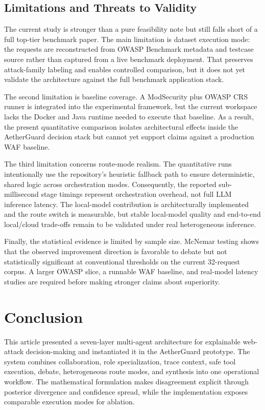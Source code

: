 \documentclass{ieeeaccess}
\newcommand{\sys}{AetherGuard}
\begin{document}
\subsection{Limitations and Threats to Validity}
The current study is stronger than a pure feasibility note but still falls short of a full top-tier benchmark paper. The main limitation is dataset execution mode: the requests are reconstructed from OWASP Benchmark metadata and testcase source rather than captured from a live benchmark deployment. That preserves attack-family labeling and enables controlled comparison, but it does not yet validate the architecture against the full benchmark application stack.

The second limitation is baseline coverage. A ModSecurity plus OWASP CRS runner is integrated into the experimental framework, but the current workspace lacks the Docker and Java runtime needed to execute that baseline. As a result, the present quantitative comparison isolates architectural effects inside the \sys{} decision stack but cannot yet support claims against a production WAF baseline.

The third limitation concerns route-mode realism. The quantitative runs intentionally use the repository's heuristic fallback path to ensure deterministic, shared logic across orchestration modes. Consequently, the reported sub-millisecond stage timings represent orchestration overhead, not full LLM inference latency. The local-model contribution is architecturally implemented and the route switch is measurable, but stable local-model quality and end-to-end local/cloud trade-offs remain to be validated under real heterogeneous inference.

Finally, the statistical evidence is limited by sample size. McNemar testing shows that the observed improvement direction is favorable to debate but not statistically significant at conventional thresholds on the current 32-request corpus. A larger OWASP slice, a runnable WAF baseline, and real-model latency studies are required before making stronger claims about superiority.

\section{Conclusion}
\label{sec:conclusion}

This article presented a seven-layer multi-agent architecture for explainable web-attack decision-making and instantiated it in the \sys{} prototype. The system combines collaboration, role specialization, trace context, safe tool execution, debate, heterogeneous route modes, and synthesis into one operational workflow. The mathematical formulation makes disagreement explicit through posterior divergence and confidence spread, while the implementation exposes comparable execution modes for ablation.
\end{document}
